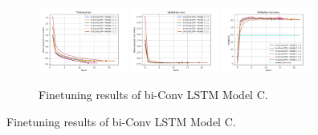 \documentclass{beamer}
\begin{document}
\begin{frame}
\begin{figure}[htbp]
        \begin{subfigure}[b]{\textwidth}
            \centering
            \includegraphics[width=0.32\textwidth]{./entities/finetuned_new/unipose2/train_losses.png}
            \includegraphics[width=0.32\textwidth]{./entities/finetuned_new/unipose2/val_losses.png}
            \includegraphics[width=0.32\textwidth]{./entities/finetuned_new/unipose2/val_accs.png}
            \caption{Finetuning results of bi-Conv LSTM Model C.}
        \end{subfigure}
        \hfill
    \end{figure}
\end{frame}
\end{document}
